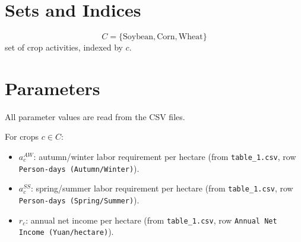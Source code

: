 \section*{Sets and Indices}

\[
C=\{\text{Soybean},\text{Corn},\text{Wheat}\}
\]
set of crop activities, indexed by \(c\).

\section*{Parameters}

All parameter values are read from the CSV files.

For crops \(c\in C\):
\begin{itemize}
\item \(a^{AW}_c\): autumn/winter labor requirement per hectare (from \texttt{table\_1.csv}, row \texttt{Person-days (Autumn/Winter)}).
\item \(a^{SS}_c\): spring/summer labor requirement per hectare (from \texttt{table\_1.csv}, row \texttt{Person-days (Spring/Summer)}).
\item \(r_c\): annual net income per hectare (from \texttt{table\_1.csv}, row \texttt{Annual Net Income (Yuan/hectare)}).
\end{itemize}

